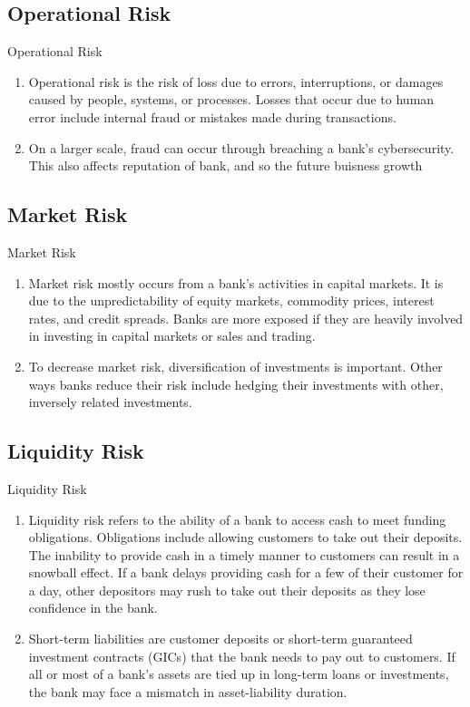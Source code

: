 \documentclass{beamer}
\begin{document}
\subsection{Operational Risk}
\begin{frame}{Operational Risk}
	\begin{enumerate}
	\item Operational risk is the risk of loss due to errors, interruptions, or damages caused by people, systems, or processes. Losses that occur due to human error include internal fraud or mistakes made during transactions.
	\item On a larger scale, fraud can occur through breaching a bank’s cybersecurity. This also affects reputation of bank, and so the future buisness growth
	\end{enumerate}
\end{frame}

\subsection{Market Risk}
\begin{frame}{Market Risk}
	\begin{enumerate}
	\item Market risk mostly occurs from a bank’s activities in capital markets. It is due to the unpredictability of equity markets, commodity prices, interest rates, and credit spreads. Banks are more exposed if they are heavily involved in investing in capital markets or sales and trading.
	\item To decrease market risk, diversification of investments is important. Other ways banks reduce their risk include hedging their investments with other, inversely related investments.
	\end{enumerate}
\end{frame}

\subsection{Liquidity Risk}
\begin{frame}{Liquidity Risk}
	\begin{enumerate}
		\item Liquidity risk refers to the ability of a bank to access cash to meet funding obligations. Obligations include allowing customers to take out their deposits. The inability to provide cash in a timely manner to customers can result in a snowball effect. If a bank delays providing cash for a few of their customer for a day, other depositors may rush to take out their deposits as they lose confidence in the bank. 
	\item Short-term liabilities are customer deposits or short-term guaranteed investment contracts (GICs) that the bank needs to pay out to customers. If all or most of a bank’s assets are tied up in long-term loans or investments, the bank may face a mismatch in asset-liability duration.
	\end{enumerate}
\end{frame}
\end{document}
